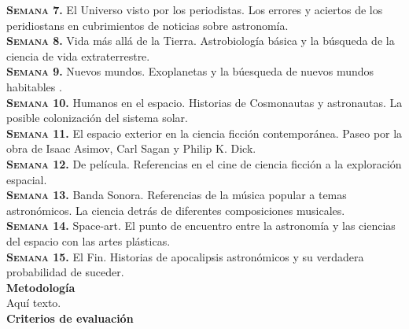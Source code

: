 \documentclass[letterpaper,10pt,onecolumn]{article}
\begin{document}
\noindent\textbf{\textsc{Semana 7.}} El Universo visto por los
periodistas. Los errores y aciertos de los peridiostans en
cubrimientos de noticias sobre astronom\'ia. \\[-0.3cm]   

\noindent\textbf{\textsc{Semana 8.}} Vida m\'as all\'a de la
Tierra. Astrobiolog\'ia b\'asica y la b\'usqueda de la ciencia de vida
extraterrestre. \\[-0.3cm]  

\noindent\textbf{\textsc{Semana 9.}} Nuevos mundos. Exoplanetas y la
b\'uesqueda de nuevos mundos habitables .\\[-0.3cm] 

\noindent\textbf{\textsc{Semana 10.}} Humanos en el espacio. Historias
de Cosmonautas y astronautas. La posible colonizaci\'on del sistema
solar. \\[-0.3cm] 

\noindent\textbf{\textsc{Semana 11.}} El espacio exterior en la
ciencia ficci\'on contempor\'anea. Paseo por la obra de Isaac Asimov,
Carl Sagan y Philip K. Dick.\\[-0.3cm] 

\noindent\textbf{\textsc{Semana 12.}} De pel\'icula. Referencias en el
cine de ciencia ficci\'on a la exploraci\'on espacial. \\[-0.3cm] 

\noindent\textbf{\textsc{Semana 13.}} Banda Sonora. Referencias de la
m\'usica popular a temas astron\'omicos. La ciencia detr\'as de
diferentes composiciones musicales. \\[-0.3cm] 

\noindent\textbf{\textsc{Semana 14.}} Space-art. El punto de encuentro
entre la astronom\'ia y las ciencias del espacio con las artes
pl\'asticas.\\[-0.3cm] 

\noindent\textbf{\textsc{Semana 15.}} El Fin. Historias de apocalipsis
astron\'omicos y su verdadera probabilidad de suceder.\\[0.1cm] 

\noindent\textbf{\large {} \quad Metodolog\'ia}\\[-0.2cm]


\noindent\normalsize Aqu\'i texto.\\[0.1cm]

\noindent\textbf{\large {} \quad Criterios de evaluaci\'on}\\[-0.2cm]
\end{document}
